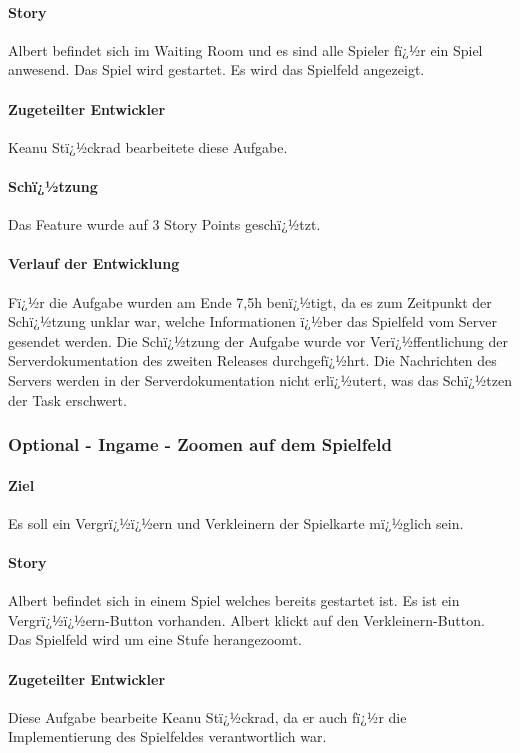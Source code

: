\documentclass[12pt, titlepage]{scrartcl}
\begin{document}
		\paragraph{Story}Albert befindet sich im Waiting Room und es sind alle Spieler fï¿½r ein Spiel anwesend. Das Spiel wird gestartet. Es wird das Spielfeld angezeigt.
		\paragraph{Zugeteilter Entwickler} Keanu Stï¿½ckrad bearbeitete diese Aufgabe.
		\paragraph{Schï¿½tzung}
		Das Feature wurde auf 3 Story Points geschï¿½tzt.
		\paragraph{Verlauf der Entwicklung} 
		Fï¿½r die Aufgabe wurden am Ende 7,5h benï¿½tigt, da es zum Zeitpunkt der Schï¿½tzung unklar war, welche Informationen ï¿½ber das Spielfeld vom Server gesendet werden. Die Schï¿½tzung der Aufgabe wurde vor Verï¿½ffentlichung der Serverdokumentation des zweiten Releases durchgefï¿½hrt. Die Nachrichten des Servers werden in der Serverdokumentation nicht erlï¿½utert, was das Schï¿½tzen der Task erschwert.
		
		\subsubsection{Optional - Ingame - Zoomen auf dem Spielfeld}
		\paragraph{Ziel} Es soll ein Vergrï¿½ï¿½ern und Verkleinern der Spielkarte mï¿½glich sein.
		\paragraph{Story}Albert befindet sich in einem Spiel welches bereits gestartet ist. Es ist ein Vergrï¿½ï¿½ern-Button vorhanden. Albert klickt auf den Verkleinern-Button. Das Spielfeld wird um eine Stufe herangezoomt.
		\paragraph{Zugeteilter Entwickler} Diese Aufgabe bearbeite Keanu Stï¿½ckrad, da er auch fï¿½r die Implementierung des Spielfeldes verantwortlich war.
\end{document}
